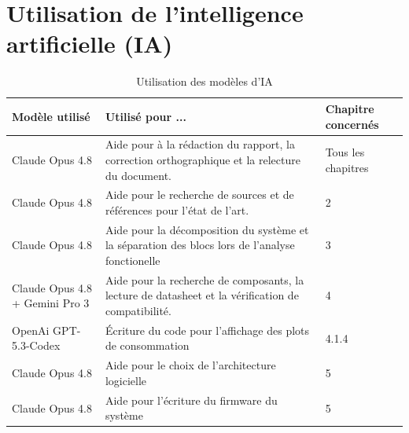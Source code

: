 \chapter{Utilisation de l'intelligence artificielle (IA)}

\begin{table}[ht]
    \begin{center}
        \caption{Utilisation des modèles d'IA}
        \begin{tabular}{m{}m{}m{}}
            \toprule
            \textbf{Modèle utilisé}        & \textbf{Utilisé pour ...}                                                                          & \textbf{Chapitre concernés} \\
            \midrule
            Claude Opus 4.8                & Aide pour à la rédaction du rapport, la correction orthographique et la relecture du document.     & Tous les \newline chapitres \\
            Claude Opus 4.8                & Aide pour le recherche de sources et de références pour l'état de l'art.                           & 2                           \\

            Claude Opus 4.8                & Aide pour la décomposition du système et la séparation des blocs lors de l'analyse fonctionelle    & 3                           \\
            Claude Opus 4.8 + Gemini Pro 3 & Aide pour la recherche de composants, la lecture de datasheet et la vérification de compatibilité. & 4                           \\
            OpenAi GPT-5.3-Codex           & Écriture du code pour l'affichage des plots de consommation                                        & 4.1.4                       \\
            Claude Opus 4.8                & Aide pour le choix de l'architecture logicielle                                                    & 5                           \\
            Claude Opus 4.8                & Aide pour l'écriture du firmware du système                                                        & 5                           \\
            \bottomrule
        \end{tabular}
    \end{center}
\end{table}